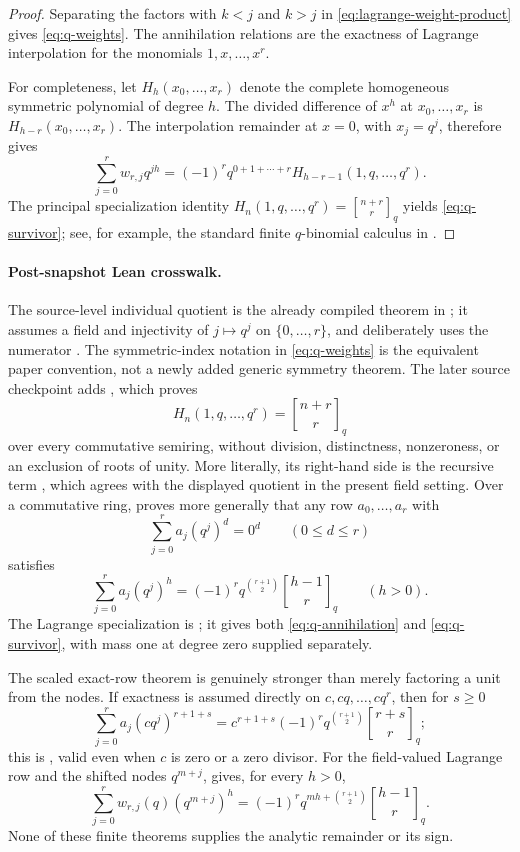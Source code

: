 \documentclass[11pt,oneside]{article}
\numberwithin{equation}{section}
\theoremstyle{definition}
\theoremstyle{remark}
\newcommand{\qbinom}[3]{\genfrac{[}{]}{0pt}{}{#1}{#2}_{#3}}
\begin{document}
\begin{proof}
Separating the factors with $k<j$ and $k>j$ in
\eqref{eq:lagrange-weight-product} gives \eqref{eq:q-weights}.  The annihilation
relations are the exactness of Lagrange interpolation for the monomials
$1,x,\ldots,x^r$.

For completeness, let
$H_h(x_0,\ldots,x_r)$ denote the complete homogeneous symmetric polynomial of degree $h$.
The divided difference of $x^h$ at $x_0,\ldots,x_r$ is
$H_{h-r}(x_0,\ldots,x_r)$.  The interpolation remainder at $x=0$, with
$x_j=q^j$, therefore gives
\[
 \sum_{j=0}^{r}w_{r,j}q^{jh}
 =(-1)^r q^{0+1+\cdots+r}
   H_{h-r-1}(1,q,\ldots,q^r).
\]
The principal specialization identity
$H_n(1,q,\ldots,q^r)=\qbinom{n+r}{r}{q}$ yields
\eqref{eq:q-survivor}; see, for example, the standard finite $q$-binomial calculus in
\cite{andrews1976}.
\end{proof}

\paragraph{Post-snapshot Lean crosswalk.}
The source-level individual quotient is the already compiled theorem
 in
; it assumes a field and injectivity of
\(j\mapsto q^j\) on \(\{0,\ldots,r\}\), and deliberately uses the numerator
.  The symmetric-index notation in
\eqref{eq:q-weights} is the equivalent paper convention, not a newly added
generic symmetry theorem.  The later source checkpoint
 adds
, which proves
\[
 H_n(1,q,\ldots,q^r)=\qbinom{n+r}{r}{q}
\]
over every commutative semiring, without division, distinctness, nonzeroness, or
an exclusion of roots of unity.  More literally, its right-hand side is the
recursive term , which agrees with the
displayed quotient in the present field setting.  Over a commutative ring,
 proves more generally that any row
\(a_0,\ldots,a_r\) with
\[
 \sum_{j=0}^{r}a_j(q^j)^d=0^d\qquad(0\le d\le r)
\]
satisfies
\[
 \sum_{j=0}^{r}a_j(q^j)^h
 =(-1)^r q^{\binom{r+1}{2}}\qbinom{h-1}{r}{q}
 \qquad(h>0).
\]
The Lagrange specialization is
; it gives both
\eqref{eq:q-annihilation} and \eqref{eq:q-survivor}, with mass one at degree
zero supplied separately.

The scaled exact-row theorem is genuinely stronger than merely factoring a
unit from the nodes.  If exactness is assumed directly on
\(c,cq,\ldots,cq^r\), then for \(s\ge0\)
\[
 \sum_{j=0}^{r}a_j(cq^j)^{r+1+s}
 =c^{r+1+s}(-1)^r q^{\binom{r+1}{2}}
   \qbinom{r+s}{r}{q};
\]
this is , valid even when
\(c\) is zero or a zero divisor.  For the field-valued Lagrange row and the
shifted nodes \(q^{m+j}\),
 gives, for every
\(h>0\),
\[
 \sum_{j=0}^{r}w_{r,j}(q)(q^{m+j})^h
 =(-1)^r q^{mh+\binom{r+1}{2}}\qbinom{h-1}{r}{q}.
\]
None of these finite theorems supplies the analytic remainder or its sign.
\end{document}
